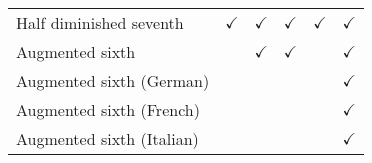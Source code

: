 \begin{tabular}{l|lllll}
Half diminished seventh   & $\checkmark$      & $\checkmark$                        & $\checkmark$                        & $\checkmark$                           & $\checkmark$                 \\
Augmented sixth           &         & $\checkmark$                        & $\checkmark$                        &                              &        $\checkmark$            \\
Augmented sixth (German)  &         &                           &                           &                              & $\checkmark$                 \\
Augmented sixth (French)  &         &                           &                           &                              & $\checkmark$                 \\
Augmented sixth (Italian) &         &                           &                           &                              & $\checkmark$                
\end{tabular}
